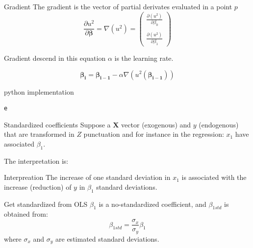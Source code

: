 \documentclass{beamer}
\begin{document}
\begin{frame}{Gradient}
The gradient is the vector of partial derivates evaluated in a point $p$
\begin{equation}
\frac{\partial u^{2}}{\partial \bm{  \beta}} = \nabla (u^{2}) = \begin{pmatrix}
\frac{\partial(u^{2})}{\partial \beta_{0}} \\
\\
\frac{\partial(u^{2})}{\partial \beta_{1}}
\end{pmatrix}
\end{equation}

\end{frame}

\begin{frame}{Gradient descend}
in this equation $\alpha$ is the learning rate.

\begin{equation}
\bm{\beta_{i}} = \bm{\beta_{i-1}} - \alpha \nabla( u^{2}(\bm{\beta_{i-1}})) 
\end{equation}
\end{frame}


\begin{frame}[fragile]{python implementation}
\begin{lstlisting}
e
\end{lstlisting}
\end{frame}




\begin{frame}{Standardized coefficients}
Suppose a $\bm{X}$ vector (exogenous)  and $y$ (endogenous) that are transformed in $Z$ punctuation and for instance in the regression: $x_{1}$ have associated $\beta_{1}$.

The interpretation is:
\begin{block}{Interpreation}
The increase of one standard deviation in $x_{1}$ is associated with the increase (reduction) of $y$ in $\beta_{1}$ standard deviations. 
\end{block}
\end{frame}


\begin{frame}{Get standardized from OLS}
$\beta_{1}$ is a no-standardized coefficient,  and $\beta_{1std}$ is obtained from:
\begin{equation}
\beta_{1std} = \frac{\sigma_{x}}{\sigma_{y}}\beta_{1}
\end{equation}
where $\sigma_{x}$ and $\sigma_{y}$ are estimated standard deviations.
\end{frame}
\end{document}
